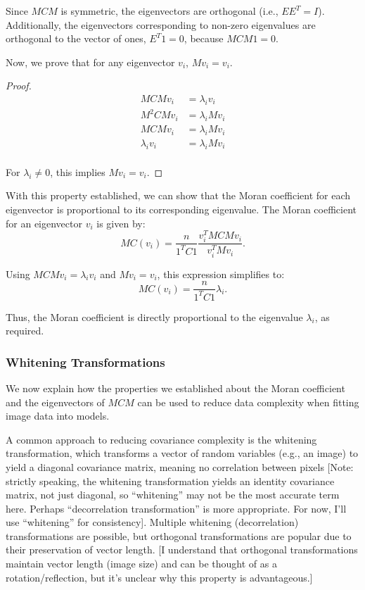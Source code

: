 \documentclass[12pt]{article}
\begin{document}
Since \( M C M \) is symmetric, the eigenvectors are orthogonal (i.e., \( E E^T = I \)). Additionally, the eigenvectors corresponding to non-zero eigenvalues are orthogonal to the vector of ones, \( E^T 1 = 0 \), because \( M C M 1 = 0 \).

Now, we prove that for any eigenvector \( v_i \), \( M v_i = v_i \).
\begin{proof}
  \begin{align*}
    M C M v_i & = \lambda_i v_i \\
    M^2 C M v_i & = \lambda_i M v_i \\
    M C M v_i & = \lambda_i M v_i \\
    \lambda_i v_i & = \lambda_i M v_i \\
  \end{align*}

  For \( \lambda_i \neq 0 \), this implies \( M v_i = v_i \).
\end{proof}

With this property established, we can show that the Moran coefficient for each eigenvector is proportional to its corresponding eigenvalue. The Moran coefficient for an eigenvector \( v_i \) is given by:
\[
  M C (v_i)=\frac{n}{1^T C 1} \frac{v_i^T M C M v_i}{v_i^T M v_i}.
\]

Using \( M C M v_i = \lambda_i v_i \) and \( M v_i = v_i \), this expression simplifies to:
\[
  M C (v_i)=\frac{n}{1^T C 1} \lambda_i.
\]

Thus, the Moran coefficient is directly proportional to the eigenvalue \( \lambda_i \), as required.

\subsubsection{Whitening Transformations}

We now explain how the properties we established about the Moran coefficient and the eigenvectors of \( M C M \) can be used to reduce data complexity when fitting image data into models.

A common approach to reducing covariance complexity is the whitening transformation, which transforms a vector of random variables (e.g., an image) to yield a diagonal covariance matrix, meaning no correlation between pixels [Note: strictly speaking, the whitening transformation yields an identity covariance matrix, not just diagonal, so ``whitening'' may not be the most accurate term here. Perhaps ``decorrelation transformation'' is more appropriate. For now, I'll use ``whitening'' for consistency]. Multiple whitening (decorrelation) transformations are possible, but orthogonal transformations are popular due to their preservation of vector length. [I understand that orthogonal transformations maintain vector length (image size) and can be thought of as a rotation/reflection, but it’s unclear why this property is advantageous.]
\end{document}

